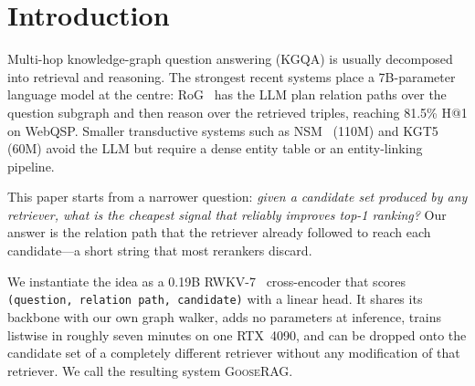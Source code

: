\documentclass[sigconf,review,anonymous]{acmart}
\begin{document}


\maketitle

\section{Introduction}
\label{sec:intro}

Multi-hop knowledge-graph question answering (KGQA) is usually decomposed into retrieval and reasoning. The strongest recent systems place a 7B-parameter language model at the centre: RoG~\cite{luo2024rog} has the LLM plan relation paths over the question subgraph and then reason over the retrieved triples, reaching 81.5\% H@1 on WebQSP. Smaller transductive systems such as NSM~\cite{he2021nsm} (110M) and KGT5~\cite{saxena2022kgt5} (60M) avoid the LLM but require a dense entity table or an entity-linking pipeline.

This paper starts from a narrower question: \emph{given a candidate set produced by any retriever, what is the cheapest signal that reliably improves top-1 ranking?} Our answer is the relation path that the retriever already followed to reach each candidate---a short string that most rerankers discard.

We instantiate the idea as a 0.19B RWKV-7~\cite{peng2023rwkv,peng2025rwkv7} cross-encoder that scores \texttt{(question, relation path, candidate)} with a linear head. It shares its backbone with our own graph walker, adds no parameters at inference, trains listwise in roughly seven minutes on one RTX~4090, and can be dropped onto the candidate set of a completely different retriever without any modification of that retriever. We call the resulting system \textsc{GooseRAG}.
\end{document}
